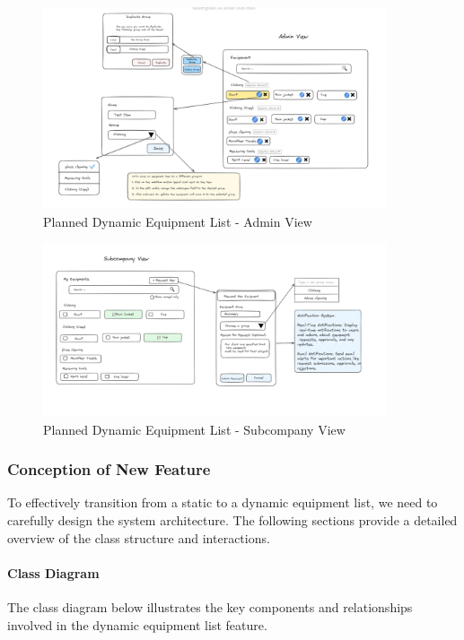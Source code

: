     \begin{figure}[H]
        \centering
        \includegraphics[width=0.9\textwidth]{src/assets/chapters/DynamicEquipementAdmin.PNG}
        \caption{Planned Dynamic Equipment List - Admin View}
        \label{fig:dynamic_equipment_list_admin}
    \end{figure}
    
    \begin{figure}[H]
        \centering
        \includegraphics[width=0.9\textwidth]{src/assets/chapters/DynamicEquipementSubcompany.PNG}
        \caption{Planned Dynamic Equipment List - Subcompany View}
        \label{fig:dynamic_equipment_list_subcompany}
    \end{figure}
    \subsubsection{Conception of New Feature}
To effectively transition from a static to a dynamic equipment list, we need to carefully design the system architecture. The following sections provide a detailed overview of the class structure and interactions.

\paragraph{Class Diagram}
The class diagram below illustrates the key components and relationships involved in the dynamic equipment list feature.

